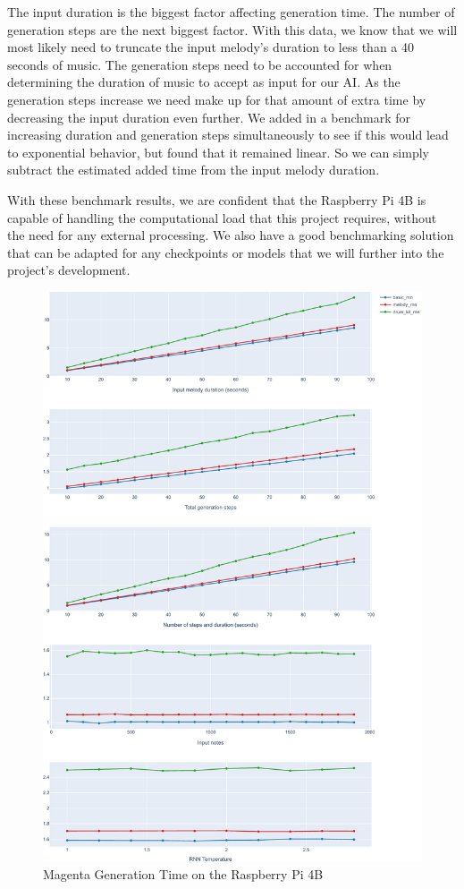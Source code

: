 The input duration is the biggest factor affecting generation time. The number of
generation steps are the next biggest factor. With this data, we know that we will most
likely need to truncate the input melody's duration to less than a 40 seconds of music.
The generation steps need to be accounted for when determining the duration of music to
accept as input for our AI. As the generation steps increase we need make up for that
amount of extra time by decreasing the input duration even further. We added in a
benchmark for increasing duration and generation steps simultaneously to see if this would
lead to exponential behavior, but found that it remained linear. So we can simply subtract
the estimated added time from the input melody duration.

With these benchmark results, we are confident that the Raspberry Pi 4B is capable of
handling the computational load that this project requires, without the need for any
external processing. We also have a good benchmarking solution that can be adapted for any
checkpoints or models that we will further into the project's development.

\begin{figure}
  \centerline{ \includegraphics[width=.95\linewidth]{image/perf.pdf} }
  \caption{Magenta Generation Time on the Raspberry Pi 4B}
  \label{fig:magentaperf}
\end{figure}

